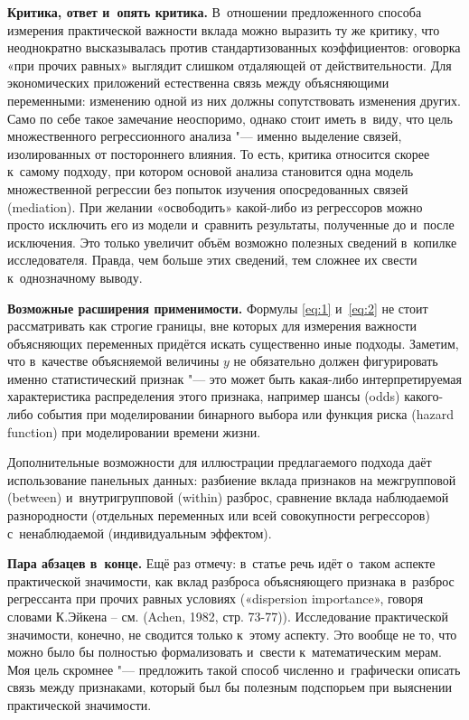 \documentclass[11pt]{article}
\begin{document}
{\bf Критика, ответ и~опять критика.} В~отношении предложенного способа измерения практической важности вклада можно выразить ту же критику, что неоднократно высказывалась против стандартизованных коэффициентов: оговорка «при прочих равных» выглядит слишком отдаляющей от действительности. Для экономических приложений естественна связь между объясняющими переменными: изменению одной из них должны сопутствовать изменения других. Само по себе такое замечание неоспоримо, однако стоит иметь в~виду, что цель множественного регрессионного анализа "--- именно выделение связей, изолированных от постороннего влияния. То есть, критика относится скорее к~самому подходу, при котором основой анализа становится одна модель множественной регрессии без попыток изучения опосредованных связей (mediation). При желании «освободить» какой-либо из регрессоров можно просто исключить его из модели и~сравнить результаты, полученные до и~после исключения. Это только увеличит объём возможно полезных сведений в~копилке исследователя. Правда, чем больше этих сведений, тем сложнее их свести к~однозначному выводу.

{\bf Возможные расширения применимости.} Формулы \eqref{eq:1} и~\eqref{eq:2} не стоит рассматривать как строгие границы, вне которых для измерения важности объясняющих переменных придётся искать существенно иные подходы. Заметим, что в~качестве объясняемой величины $y$ не обязательно должен фигурировать именно статистический признак "--- это может быть какая-либо интерпретируемая характеристика распределения этого признака, например шансы (odds) какого-либо события при моделировании бинарного выбора или функция риска (hazard function) при моделировании времени жизни.

Дополнительные возможности для иллюстрации предлагаемого подхода даёт использование панельных данных: разбиение вклада признаков на межгрупповой (between) и~внутригрупповой (within) разброс, сравнение вклада наблюдаемой разнородности (отдельных переменных или всей совокупности регрессоров) с~ненаблюдаемой (индивидуальным эффектом).

{\bf Пара абзацев в~конце.} Ещё раз отмечу: в~статье речь идёт о~таком аспекте практической значимости, как вклад разброса объясняющего признака в~разброс регрессанта при прочих равных условиях («dispersion importance», говоря словами К.Эйкена – см. (Achen, 1982, стр. 73-77)). Исследование практической значимости, конечно, не сводится только к~этому аспекту. Это вообще не то, что можно было бы полностью формализовать и~свести к~математическим мерам. Моя цель скромнее "--- предложить такой способ численно и~графически описать связь между признаками, который был бы полезным подспорьем при выяснении практической значимости.
\end{document}
